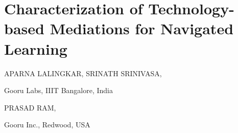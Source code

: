 \chapter{Characterization of Technology-based Mediations for Navigated Learning}

\begin{center}
{\large\uppercase{APARNA LALINGKAR, SRINATH SRINIVASA}}, 

\vskip -6pt

Gooru Labs, IIIT Bangalore, India

\bigskip
{\large\uppercase{PRASAD RAM,}} 

\vskip -6pt

Gooru Inc., Redwood, USA
\end{center}

\newpage

